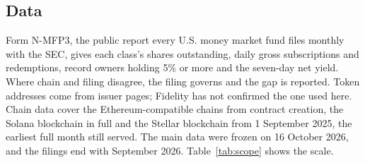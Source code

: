 \documentclass[12pt,a4paper]{article}
\begin{document}
\subsection{Data}
Form \mbox{N-MFP3}, the public report every U.S. money market fund files monthly with the SEC, gives each class's shares outstanding, daily gross subscriptions and redemptions, record owners holding 5\% or more and the seven-day net yield. Where chain and filing disagree, the filing governs and the gap is reported. Token addresses come from issuer pages; Fidelity has not confirmed the one used here. Chain data cover the Ethereum-compatible chains from contract creation, the Solana blockchain in full and the Stellar blockchain from 1 September 2025, the earliest full month still served. The main data were frozen on 16 October 2026, and the filings end with September 2026. Table~\ref{tab:scope} shows the scale.
\end{document}
